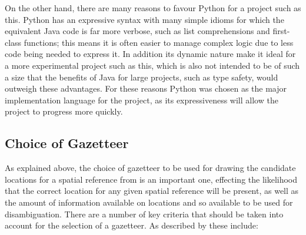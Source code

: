 \documentclass[12pt, a4paper]{report}
\begin{document}
On the other hand, there are many reasons to favour Python for a project such as this. Python has an expressive syntax with many simple idioms for which the equivalent Java code is far more verbose, such as list comprehensions and first-class functions; this means it is often easier to manage complex logic due to less code being needed to express it. In addition its dynamic nature make it ideal for a more experimental project such as this, which is also not intended to be of such a size that the benefits of Java for large projects, such as type safety, would outweigh these advantages. For these reasons Python was chosen as the major implementation language for the project, as its expressiveness will allow the project to progress more quickly. 

\subsection{Choice of Gazetteer}
\label{subsec_gazetteer}


As explained above, the choice of gazetteer to be used for drawing the candidate locations for a spatial reference from is an important one, effecting the likelihood that the correct location for any given spatial reference will be present, as well as the amount of information available on locations and so available to be used for disambiguation. There are a number of key criteria that should be taken into account for the selection of a gazetteer. As described by \citet{leidner2004} these include:

\end{document}
